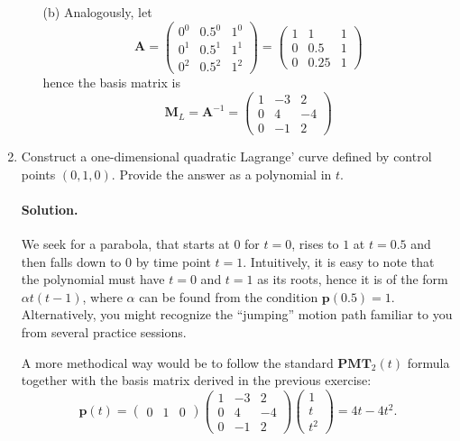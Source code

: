 \documentclass{article}
\newcommand{\bp}{\mathbf{p}}
\newcommand{\bM}{\mathbf{M}}
\newcommand{\bA}{\mathbf{A}}
\newcommand{\bP}{\mathbf{P}}
\newcommand{\bT}{\mathbf{T}}
\begin{document}
\begin{enumerate}
\begin{enumerate}
\item[(b)] Analogously, let
$$
\bA = \left(\begin{matrix} 0^0 & 0.5^0 & 1^0 \\ 0^1 & 0.5^1 & 1^1 \\ 0^2 & 0.5^2 & 1^2 \end{matrix}\right) = \left(\begin{matrix} 1 & 1 & 1 \\ 0 & 0.5 & 1 \\ 0 & 0.25 & 1 \end{matrix}\right)
$$
hence the basis matrix is
$$
\bM_L = \bA^{-1} = \left(\begin{matrix} 1 & -3 & 2\\ 0 & 4 & -4 \\ 0 & -1 & 2 \end{matrix}\right)
$$
\end{enumerate}

\item Construct a one-dimensional quadratic Lagrange' curve defined by control points $(0, 1, 0)$. Provide the answer as a polynomial in $t$.

\paragraph{Solution.}
We seek for a parabola, that starts at $0$ for $t=0$, rises to $1$ at $t=0.5$ and then falls down to $0$ by time point $t=1$. Intuitively, it is easy to note that the polynomial must have $t=0$ and $t=1$ as its roots, hence it is of the form $\alpha t(t-1)$, where $\alpha$ can be found from the condition $\bp(0.5)=1$.
Alternatively, you might recognize the ``jumping'' motion path familiar to you from several practice sessions.

A more methodical way would be to follow the standard $\bP\bM\bT_2(t)$ formula together with the basis matrix derived in the previous exercise:
$$
\bp(t) = \left(\begin{matrix} 0 & 1 & 0 \end{matrix}\right)\left(\begin{matrix} 1 & -3 & 2\\ 0 & 4 & -4 \\ 0 & -1 & 2 \end{matrix}\right)\left(\begin{matrix} 1 \\ t \\ t^2 \end{matrix}\right) = 4t - 4t^2.
$$


\end{enumerate}
\end{document}
